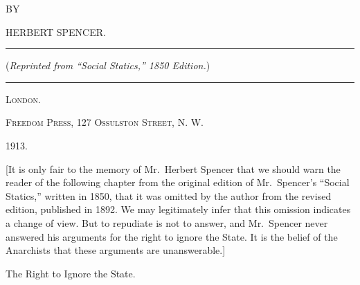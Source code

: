\documentclass[oneside]{book}
\begin{document}
\begin{center}{BY}\end{center}

\begin{center}{\large HERBERT SPENCER.}\end{center}

\vspace{\baselineskip}

\begin{center}\rule{2in}{0.5pt}\end{center}

\vspace{\baselineskip}

\begin{center}{(\textit{Reprinted from ``Social Statics,'' 1850 Edition.})}\end{center}

\vspace{\baselineskip}

\hrule

\begin{center}{\textsc{London.}}\end{center}

\begin{center}{\textsc{Freedom Press, 127 Ossulston Street, N. W.}}\end{center}

\begin{center}{1913.}\end{center}


\newpage


[It is only fair to the memory of Mr.\ Herbert Spencer that
we should warn the reader of the following chapter from the
original edition of Mr.\ Spencer's ``Social Statics,'' written in
1850, that it was omitted by the author from the revised edition,
published in 1892. We may legitimately infer that this omission
indicates a change of view. But to repudiate is not to answer,
and Mr.\ Spencer never answered his arguments for the right to
ignore the State. It is the belief of the Anarchists that these
arguments are unanswerable.]


\newpage\pagestyle{plain}





\begin{center}{\LARGE The Right to Ignore the State.}\end{center}
\end{document}
